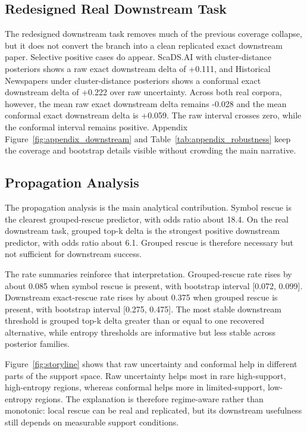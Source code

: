 \subsection{Redesigned Real Downstream Task}

The redesigned downstream task removes much of the previous coverage collapse, but it does not convert the branch into a clean replicated exact downstream paper. Selective positive cases do appear. ScaDS.AI with cluster-distance posteriors shows a raw exact downstream delta of +0.111, and Historical Newspapers under cluster-distance posteriors shows a conformal exact downstream delta of +0.222 over raw uncertainty. Across both real corpora, however, the mean raw exact downstream delta remains -0.028 and the mean conformal exact downstream delta is +0.059. The raw interval crosses zero, while the conformal interval remains positive. Appendix Figure~\ref{fig:appendix_downstream} and Table~\ref{tab:appendix_robustness} keep the coverage and bootstrap details visible without crowding the main narrative.

\subsection{Propagation Analysis}

The propagation analysis is the main analytical contribution. Symbol rescue is the clearest grouped-rescue predictor, with odds ratio about 18.4. On the real downstream task, grouped top-k delta is the strongest positive downstream predictor, with odds ratio about 6.1. Grouped rescue is therefore necessary but not sufficient for downstream success.

The rate summaries reinforce that interpretation. Grouped-rescue rate rises by about 0.085 when symbol rescue is present, with bootstrap interval [0.072, 0.099]. Downstream exact-rescue rate rises by about 0.375 when grouped rescue is present, with bootstrap interval [0.275, 0.475]. The most stable downstream threshold is grouped top-k delta greater than or equal to one recovered alternative, while entropy thresholds are informative but less stable across posterior families.

Figure~\ref{fig:storyline} shows that raw uncertainty and conformal help in different parts of the support space. Raw uncertainty helps most in rare high-support, high-entropy regions, whereas conformal helps more in limited-support, low-entropy regions. The explanation is therefore regime-aware rather than monotonic: local rescue can be real and replicated, but its downstream usefulness still depends on measurable support conditions.
